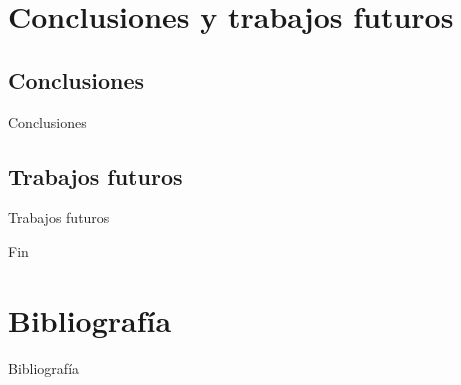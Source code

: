 \documentclass[12pt,hyperref={pdfpagelabels=false}]{beamer}
\begin{document}
\section{Conclusiones y trabajos futuros}
\subsection{Conclusiones}
\begin{frame}{Conclusiones}
\end{frame}

\subsection{Trabajos futuros}
\begin{frame}{Trabajos futuros}
\end{frame}

\begin{frame}
	\begin{center}
		\Huge Fin
	\end{center}
\end{frame}

\section{Bibliografía}
\begin{frame}[allowframebreaks]{Bibliografía}
	
	
\end{frame}
\end{document}

